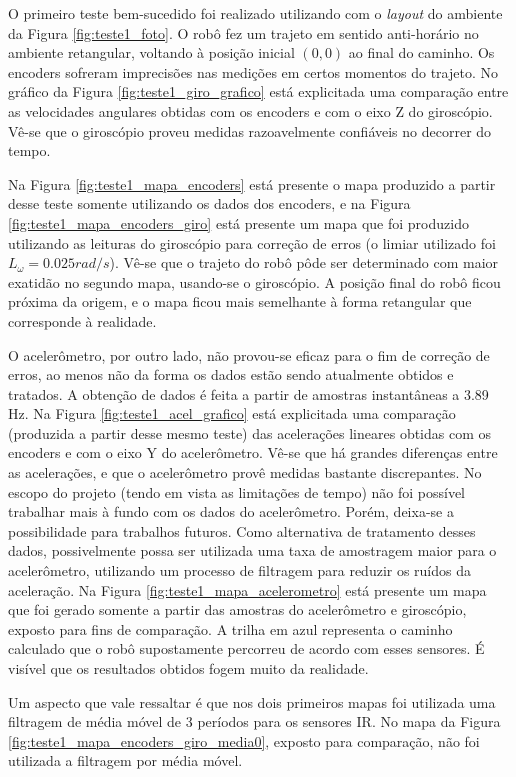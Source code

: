 O primeiro teste bem-sucedido foi realizado utilizando com o \textit{layout} do ambiente da Figura \ref{fig:teste1_foto}. O robô fez um trajeto em sentido anti-horário no ambiente retangular, voltando à posição inicial $(0,0)$ ao final do caminho. Os encoders sofreram imprecisões nas medições em certos momentos do trajeto. No gráfico da Figura \ref{fig:teste1_giro_grafico} está explicitada uma comparação entre as velocidades angulares obtidas com os encoders e com o eixo Z do giroscópio. Vê-se que o giroscópio proveu medidas razoavelmente confiáveis no decorrer do tempo. 

Na Figura \ref{fig:teste1_mapa_encoders} está presente o mapa produzido a partir desse teste somente utilizando os dados dos encoders, e na Figura \ref{fig:teste1_mapa_encoders_giro} está presente um mapa que foi produzido utilizando as leituras do giroscópio para correção de erros (o limiar utilizado foi $L_\omega = 0.025 \unit{rad/s}$). Vê-se que o trajeto do robô pôde ser determinado com maior exatidão no segundo mapa, usando-se o giroscópio. A posição final do robô ficou próxima da origem, e o mapa ficou mais semelhante à forma retangular que corresponde à realidade. 

O acelerômetro, por outro lado, não provou-se eficaz para o fim de correção de erros, ao menos não da forma os dados estão sendo atualmente obtidos e tratados. A obtenção de dados é feita a partir de amostras instantâneas a 3.89 Hz. Na Figura \ref{fig:teste1_acel_grafico} está explicitada uma comparação (produzida a partir desse mesmo teste) das acelerações lineares obtidas com os encoders e com o eixo Y do acelerômetro. Vê-se que há grandes diferenças entre as acelerações, e que o acelerômetro provê medidas bastante discrepantes. No escopo do projeto (tendo em vista as limitações de tempo) não foi possível trabalhar mais à fundo com os dados do acelerômetro. Porém, deixa-se a possibilidade para trabalhos futuros. Como alternativa de tratamento desses dados, possivelmente possa ser utilizada uma taxa de amostragem maior para o acelerômetro, utilizando um processo de filtragem para reduzir os ruídos da aceleração. Na Figura \ref{fig:teste1_mapa_acelerometro} está presente um mapa que foi gerado somente a partir das amostras do acelerômetro e giroscópio, exposto para fins de comparação. A trilha em azul representa o caminho calculado que o robô supostamente percorreu de acordo com esses sensores. É visível que os resultados obtidos fogem muito da realidade.

Um aspecto que vale ressaltar é que nos dois primeiros mapas foi utilizada uma filtragem de média móvel de 3 períodos para os sensores IR. No mapa da Figura \ref{fig:teste1_mapa_encoders_giro_media0}, exposto para comparação, não foi utilizada a filtragem por média móvel.



